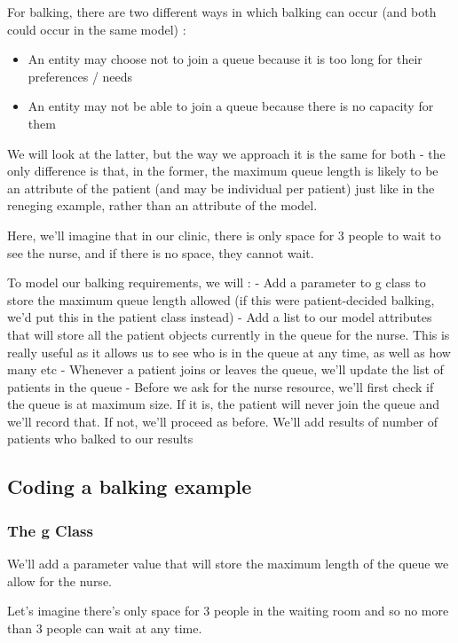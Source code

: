 \documentclass[
  letterpaper,
  DIV=11,
  numbers=noendperiod]{scrreprt}
\providecommand{\tightlist}{%
  \setlength{\itemsep}{0pt}\setlength{\parskip}{0pt}}\usepackage{longtable,booktabs,array}
\begin{document}
For balking, there are two different ways in which balking can occur
(and both could occur in the same model) :

\begin{itemize}
\tightlist
\item
  An entity may choose not to join a queue because it is too long for
  their preferences / needs
\item
  An entity may not be able to join a queue because there is no capacity
  for them
\end{itemize}

We will look at the latter, but the way we approach it is the same for
both - the only difference is that, in the former, the maximum queue
length is likely to be an attribute of the patient (and may be
individual per patient) just like in the reneging example, rather than
an attribute of the model.

Here, we'll imagine that in our clinic, there is only space for 3 people
to wait to see the nurse, and if there is no space, they cannot wait.

To model our balking requirements, we will : - Add a parameter to g
class to store the maximum queue length allowed (if this were
patient-decided balking, we'd put this in the patient class instead) -
Add a list to our model attributes that will store all the patient
objects currently in the queue for the nurse. This is really useful as
it allows us to see who is in the queue at any time, as well as how many
etc - Whenever a patient joins or leaves the queue, we'll update the
list of patients in the queue - Before we ask for the nurse resource,
we'll first check if the queue is at maximum size. If it is, the patient
will never join the queue and we'll record that. If not, we'll proceed
as before. We'll add results of number of patients who balked to our
results

\subsection{Coding a balking example}\label{coding-a-balking-example}

\subsubsection{The g Class}\label{the-g-class-6}

We'll add a parameter value that will store the maximum length of the
queue we allow for the nurse.

Let's imagine there's only space for 3 people in the waiting room and so
no more than 3 people can wait at any time.
\end{document}

